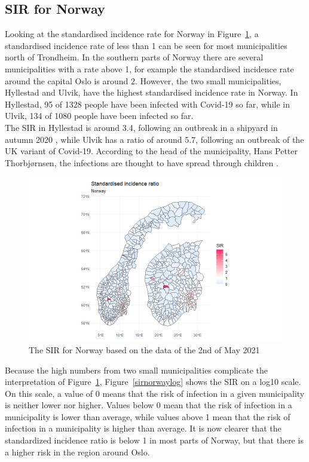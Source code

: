 \subsection{SIR for Norway}
Looking at the standardised incidence rate for Norway in Figure~\ref{sirnorway}, a standardised incidence rate of less than 1 can be seen for most municipalities north of Trondheim. In the southern parts of Norway there are several municipalities with a rate above 1, for example the standardised incidence rate around the capital Oslo is around 2. However, the two small municipalities, Hyllestad and Ulvik, have the highest standardised incidence rate in Norway. In Hyllestad, 95 of 1328 people have been infected with Covid-19 so far, while in Ulvik, 134 of 1080 people have been infected so far. \\
The SIR in Hyllestad is around 3.4, following an outbreak in a shipyard in autumn 2020 \autocite[][]{newspaper1}, while Ulvik has a ratio of around 5.7, following an outbreak of the UK variant of Covid-19. According to the head of the municipality, Hans Petter Thorbjørnsen, the infections are thought to have spread through children \autocite[][]{newspaper2}.
\begin{figure}[H]
 \centering
 \includegraphics[width = 1.2\textwidth]{sir_norway.png}
 \caption{The SIR for Norway based on the data of the 2nd of May 2021}
 \label{sirnorway}
\end{figure}
Because the high numbers from two small municipalities complicate the interpretation of Figure~\ref{sirnorway}, Figure~\ref{sirnorwaylog} shows the SIR on a log10 scale. On this scale, a value of 0 means that the risk of infection in a given municipality is neither lower nor higher. Values below 0 mean that the risk of infection in a municipality is lower than average, while values above 1 mean that the risk of infection in a municipality is higher than average. It is now clearer that the standardized incidence ratio is below 1 in most parts of Norway, but that there is a higher risk in the region around Oslo.
